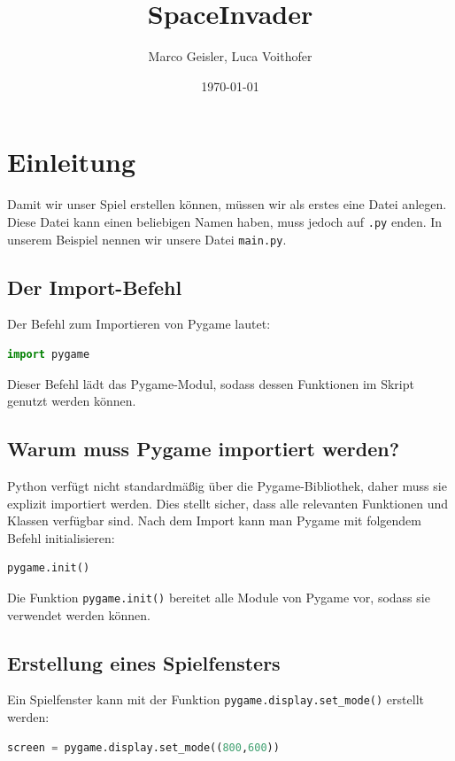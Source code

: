 \documentclass{article}
\begin{document}
\title{SpaceInvader}
\author{Marco Geisler, Luca Voithofer}
\date{\today}
\maketitle

\section{Einleitung}
Damit wir unser Spiel erstellen können, müssen wir als erstes eine Datei anlegen. Diese Datei kann einen beliebigen Namen haben, muss jedoch auf \texttt{.py} enden. In unserem Beispiel nennen wir unsere Datei \texttt{main.py}.

\subsection{Der Import-Befehl}
Der Befehl zum Importieren von Pygame lautet:

\begin{lstlisting}[style=pythonstyle, language=Python]
import pygame
\end{lstlisting}

Dieser Befehl lädt das Pygame-Modul, sodass dessen Funktionen im Skript genutzt werden können.

\subsection{Warum muss Pygame importiert werden?}
Python verfügt nicht standardmäßig über die Pygame-Bibliothek, daher muss sie explizit importiert werden. Dies stellt sicher, dass alle relevanten Funktionen und Klassen verfügbar sind. Nach dem Import kann man Pygame mit folgendem Befehl initialisieren:

\begin{lstlisting}[style=pythonstyle, language=Python]
pygame.init()
\end{lstlisting}

Die Funktion \texttt{pygame.init()} bereitet alle Module von Pygame vor, sodass sie verwendet werden können.

\subsection{Erstellung eines Spielfensters}
Ein Spielfenster kann mit der Funktion \texttt{pygame.display.set\_mode()} erstellt werden:

\begin{lstlisting}[style=pythonstyle, language=Python]
screen = pygame.display.set_mode((800,600))
\end{lstlisting}
\end{document}
